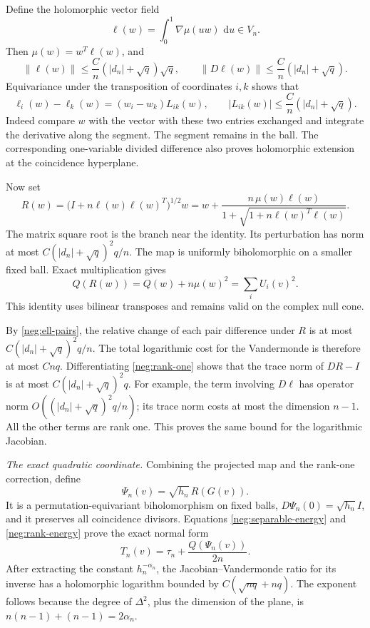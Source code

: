 \documentclass[11pt]{article}
\numberwithin{equation}{section}
\theoremstyle{definition}
\newcommand{\dd}{\,\mathrm d}
\begin{document}
Define the holomorphic vector field
\begin{equation}
 \ell(w)=\int_0^1\nabla\mu(u w)\,\dd u\in V_n.
 \label{neg:ell}
\end{equation}
Then \(\mu(w)=w^T\ell(w)\), and
\[
 \|\ell(w)\|\le\frac Cn(|d_n|+\sqrt q)\sqrt q,\qquad
 \|D\ell(w)\|\le\frac Cn(|d_n|+\sqrt q).
 \]
Equivariance under the transposition of coordinates \(i,k\)
shows that
\begin{equation}
 \ell_i(w)-\ell_k(w)=(w_i-w_k)L_{ik}(w),\qquad
 |L_{ik}(w)|\le\frac Cn(|d_n|+\sqrt q).
 \label{neg:ell-pairs}
\end{equation}
Indeed compare \(w\) with the vector with these two entries
exchanged and integrate the derivative along the segment.
The segment remains in the ball.  The corresponding
one-variable divided difference also proves holomorphic
extension at the coincidence hyperplane.

Now set
\begin{equation}
 R(w)=\bigl(I+n\ell(w)\ell(w)^T\bigr)^{1/2}w
     =w+\frac{n\,\mu(w)\ell(w)}
                   {1+\sqrt{1+n\ell(w)^T\ell(w)}}.
 \label{neg:rank-one}
\end{equation}
The matrix square root is the branch near the identity.
Its perturbation has norm at most
\(C(|d_n|+\sqrt q)^2q/n\).  The map is uniformly
biholomorphic on a smaller fixed ball.  Exact multiplication
gives
\begin{equation}
 Q(R(w))=Q(w)+n\mu(w)^2=\sum_i U_i(v)^2 .
 \label{neg:rank-energy}
\end{equation}
This identity uses bilinear transposes and remains valid on
the complex null cone.

By \eqref{neg:ell-pairs}, the relative change of each pair
difference under \(R\) is at most
\(C(|d_n|+\sqrt q)^2q/n\).
The total logarithmic cost for the Vandermonde is therefore
at most \(Cnq\).  Differentiating \eqref{neg:rank-one}
shows that the trace norm of \(DR-I\) is at most
\(C(|d_n|+\sqrt q)^2q\).  For example, the term involving
\(D\ell\) has operator norm \(O((|d_n|+\sqrt q)^2q/n)\);
its trace norm costs at most the dimension \(n-1\).
All the other terms are rank one.  This proves the same
bound for the logarithmic Jacobian.

\emph{The exact quadratic coordinate.} Combining the projected
map and the rank-one correction, define
\begin{equation}
 \Psi_n(v)=\sqrt{h_n}\,R(G(v)).
 \label{neg:Psi}
\end{equation}
It is a permutation-equivariant biholomorphism on fixed
balls, \(D\Psi_n(0)=\sqrt{h_n}I\), and it preserves all
coincidence divisors.  Equations
\eqref{neg:separable-energy} and \eqref{neg:rank-energy}
prove the exact normal form
\begin{equation}
 T_n(v)=\tau_n+\frac{Q(\Psi_n(v))}{2n}.
 \label{neg:exact-quadratic}
\end{equation}
After extracting the constant \(h_n^{-\alpha_n}\), the
Jacobian--Vandermonde ratio for its inverse has a
holomorphic logarithm bounded by
\(C(\sqrt{nq}+nq)\).  The exponent follows because the
degree of \(\Delta^2\), plus the dimension of the plane,
is \(n(n-1)+(n-1)=2\alpha_n\).
\end{document}
